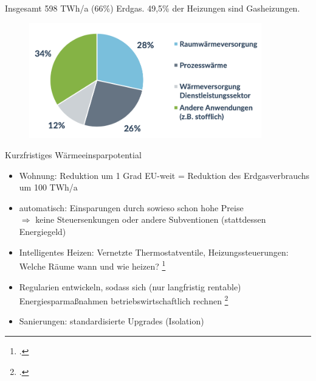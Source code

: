 \documentclass[10pt]{beamer}
\begin{document}
\begin{frame}
Insgesamt 598 TWh/a (66\%) Erdgas. 49,5\% der Heizungen sind Gasheizungen.

\begin{figure}
\includegraphics[width=0.9\textwidth]{fig/einsatz_erdgas.png}

\scriptsize{}
\end{figure}
\end{frame}


\begin{frame}{Kurzfristiges Wärmeeinsparpotential}
  \small{
  \begin{itemize}
    \item Wohnung: Reduktion um 1 Grad EU-weit = Reduktion des Erdgasverbrauchs um 100 TWh/a 
    \item automatisch: Einsparungen durch sowieso schon hohe Preise  \\
      $\Rightarrow$ keine Steuersenkungen oder andere Subventionen (stattdessen Energiegeld) 
    \item Intelligentes Heizen: Vernetzte Thermostatventile, Heizungssteuerungen: Welche Räume wann und wie heizen? \footcite{clausen2022}
    \item Regularien entwickeln, sodass sich (nur langfristig rentable) Energiesparmaßnahmen
      betriebswirtschaftlich rechnen \footcite{clausen2022}
    \item Sanierungen: standardisierte Upgrades (Isolation) 
  \end{itemize}
  }
\end{frame}
\end{document}
